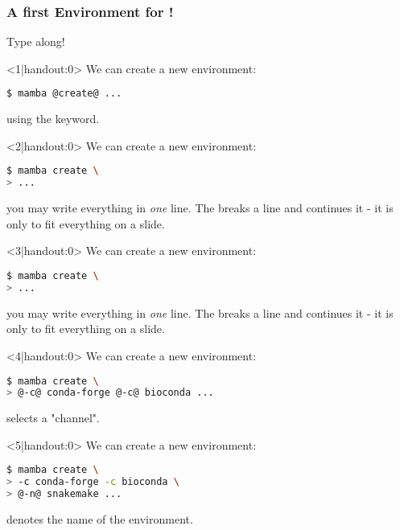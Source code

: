 \begin{frame}[fragile]
	\frametitle{A first Environment for \Snakemake!}
	\begin{task}
		Type along!
	\end{task}
    \begin{onlyenv}<1|handout:0>
      We can create a new environment:
      \begin{lstlisting}[language=Bash, style=Shell]
$ mamba @create@ ...
      \end{lstlisting}
      using the  keyword.
    \end{onlyenv}
    \begin{onlyenv}<2|handout:0>
    	We can create a new environment:
    	\begin{lstlisting}[language=Bash, style=Shell]
$ mamba create \
> ...
    	\end{lstlisting}
    	you may write everything in \emph{one} line. The \altverb{\\} breaks a line and \altverb{>} continues it - it is only to fit everything on a slide.
    \end{onlyenv}
    \begin{onlyenv}<3|handout:0>
    	We can create a new environment:
    	\begin{lstlisting}[language=Bash, style=Shell]
$ mamba create \
> ...
    	\end{lstlisting}
    	you may write everything in \emph{one} line. The \altverb{\\} breaks a line and \altverb{>} continues it - it is only to fit everything on a slide.
    \end{onlyenv}
    \begin{onlyenv}<4|handout:0>
    	We can create a new environment:
    	\begin{lstlisting}[language=Bash, style=Shell]
$ mamba create \
> @-c@ conda-forge @-c@ bioconda ...
    	\end{lstlisting}
    	 selects a "channel".
    \end{onlyenv}
    \begin{onlyenv}<5|handout:0>
    	We can create a new environment:
    	\begin{lstlisting}[language=Bash, style=Shell]
$ mamba create \
> -c conda-forge -c bioconda \
> @-n@ snakemake ...
    	\end{lstlisting}
    	\altverb{-n} denotes the name of the environment.
    \end{onlyenv}

\end{frame}

